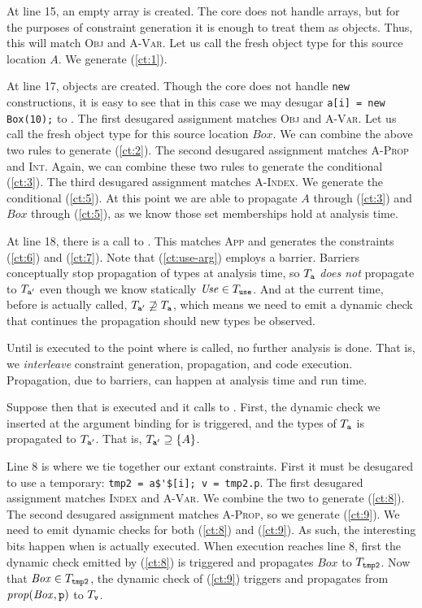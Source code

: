 At line 15, an empty array is created. The core does not handle arrays, but
for the purposes of constraint generation it is enough to treat them as
objects. Thus, this will match \textsc{Obj} and \textsc{A-Var}. Let us call
the fresh object type for this source location $A$. We generate (\ref{ct:1}).

At line 17,  objects are created. Though the core does not handle
\lstinline{new} constructions, it is easy to see that in this case we may
desugar \lstinline{a[i] = new Box(10);} to . The first desugared assignment matches \textsc{Obj} and
\textsc{A-Var}. Let us call the fresh object type for this source location
$\mathit{Box}$. We can combine the above two rules to generate (\ref{ct:2}).
The second desugared assignment matches \textsc{A-Prop} and
\textsc{Int}. Again, we can combine these two rules to generate the
conditional (\ref{ct:3}).  The third desugared assignment matches
\textsc{A-Index}. We generate the conditional (\ref{ct:5}). At this point we are able to propagate $\mathit{A}$ through (\ref{ct:3}) and $\mathit{Box}$ through (\ref{ct:5}), as we know those set memberships hold at analysis time.

At line 18, there is a call to . This matches \textsc{App} and
generates the constraints (\ref{ct:6}) and (\ref{ct:7}). Note that
(\ref{ct:use-arg}) employs a barrier. Barriers conceptually stop propagation
of types at analysis time, so $T_{\texttt{a}}$ \emph{does not} propagate to
$T_{\texttt{a}'}$ even though we know statically $\mathit{Use} \in
T_{\texttt{use}}$. And at the current time, before  is actually
called, $T_{\texttt{a}'} \not\supseteq T_{\texttt{a}}$, which means we need to
emit a dynamic check that continues the propagation should new types be
observed.

Until  is executed to the point where  is called, no
further analysis is done. That is, we \emph{interleave} constraint generation,
propagation, and code execution. Propagation, due to barriers, can happen at
analysis time and run time.

Suppose then that  is executed and it calls to . First,
the dynamic check we inserted at the argument binding for  is
triggered, and the types of $T_{\texttt{a}}$ is propagated to
$T_{\texttt{a}'}$. That is, $T_{\texttt{a}'} \supseteq \{A\}$.

Line 8 is where we tie together our extant constraints. First it must be
desugared to use a temporary: \lstinline{tmp2 = a$'$[i]; v = tmp2.p}. The
first desugared assignment matches \textsc{Index} and \textsc{A-Var}. We
combine the two to generate (\ref{ct:8}). The second desugared assignment
matches \textsc{A-Prop}, so we generate (\ref{ct:9}). We need to emit dynamic
checks for both (\ref{ct:8}) and (\ref{ct:9}). As such, the interesting bits
happen when  is actually executed. When execution reaches line 8,
first the dynamic check emitted by (\ref{ct:8}) is triggered and propagates
$\mathit{Box}$ to $T_{\texttt{tmp2}}$. Now that $\mathit{Box} \in
T_{\texttt{tmp2}}$, the dynamic check of (\ref{ct:9}) triggers and propagates
 from $\mathit{prop}(\mathit{Box}, \texttt{p})$ to $T_{\texttt{v}}$.

